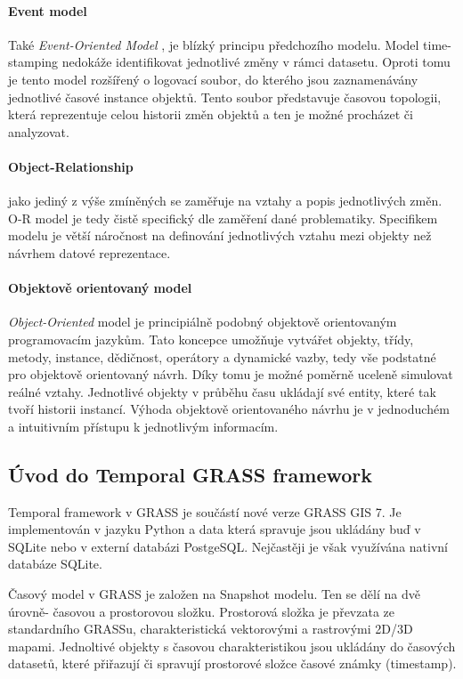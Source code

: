 \documentclass[a4paper,12pt,oneside]{report}
\begin{document}
\paragraph*{Event model}
Také \textit{Event-Oriented Model }, je blízký principu předchozího modelu. Model time-stamping nedokáže identifikovat jednotlivé změny v rámci datasetu. Oproti tomu je tento model rozšířený  o logovací soubor, do kterého jsou zaznamenávány jednotlivé časové instance objektů. Tento soubor představuje časovou topologii, která reprezentuje celou historii změn objektů a ten je možné procházet či analyzovat.

\paragraph*{Object-Relationship}
jako jediný z výše zmíněných se zaměřuje na vztahy a popis jednotlivých změn. O-R model je tedy čistě specifický dle zaměření dané problematiky. Specifikem  modelu je větší náročnost na definování jednotlivých vztahu mezi objekty než návrhem datové reprezentace. 

\paragraph*{Objektově orientovaný model}
\textit{Object-Oriented} model je principiálně podobný objektově orientovaným programovacím jazykům. Tato koncepce umožňuje vytvářet  objekty, třídy, metody, instance, dědičnost, operátory a dynamické vazby, tedy vše podstatné pro objektově orientovaný návrh. Díky tomu je možné poměrně uceleně simulovat reálné vztahy.  Jednotlivé objekty v průběhu času ukládají své entity, které tak tvoří historii instancí. Výhoda objektově orientovaného návrhu je v jednoduchém a intuitivním přístupu k jednotlivým informacím. 



\subsection{Úvod do Temporal GRASS framework}
Temporal framework v GRASS je součástí nové verze GRASS GIS 7. Je implementován v jazyku Python a data která spravuje jsou ukládány buď v SQLite nebo v externí databázi PostgeSQL. Nejčastěji je však využívána nativní databáze SQLite.

Časový model v GRASS je založen na Snapshot modelu. Ten se dělí na dvě úrovně- časovou a prostorovou složku. Prostorová složka je převzata ze standardního  GRASSu, charakteristická vektorovými a rastrovými 2D/3D mapami. Jednoltivé objekty s časovou charakteristikou jsou ukládány do  časových datasetů, které přiřazují či spravují prostorové složce časové známky (timestamp).
\end{document}
